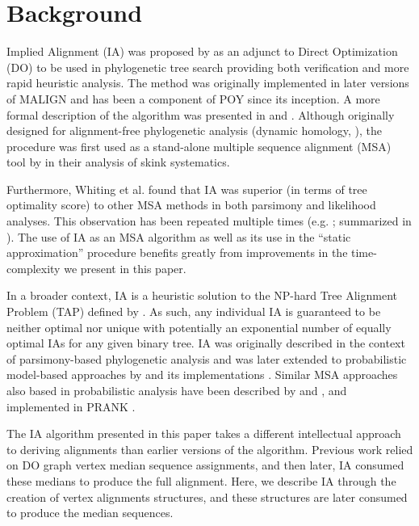 \documentclass{bmcart}
\begin{document}
\section*{Background}

Implied Alignment (IA) was proposed by \cite{Wheeler2003} as an adjunct to Direct Optimization (DO) \citep{Wheeler1996,VaronandWheeler2012} to be used in phylogenetic tree search providing both verification and more rapid heuristic analysis.
The method was originally implemented in later versions of MALIGN \citep{Wheeler1991-1998} and has been a component of POY \citep{Wheeleretal2015, POY2, POY3, POY5, Wheeleretal2006} since its inception.
A more formal description of the algorithm was presented in \cite{Wheeleretal2006} and \cite{VaronandWheeler2012}.
Although originally designed for alignment-free phylogenetic analysis (dynamic homology, \citealp{Wheeler2001}), the procedure was first used as a stand-alone multiple sequence alignment (MSA) tool by \cite{WhitingAetal2006} in their analysis of skink systematics.

Furthermore, Whiting et al. found that IA was superior (in terms of tree optimality score) to other MSA methods in both parsimony and likelihood analyses.
This observation has been repeated multiple times (e.g. \citealp{LindgrenandDaly2007, Lehtonen2008, WheelerandGiribet2009, FordandWheeler2015}; summarized in \citealp{Wheeler2012}).
The use of IA as an MSA algorithm as well as its use in the ``static approximation'' procedure \citep{Wheeler2003b} benefits greatly from improvements in the time-complexity we present in this paper.

In a broader context, IA is a heuristic solution to the NP-hard Tree Alignment Problem (TAP) defined by \cite{sankoff1975}.
As such, any individual IA is guaranteed to be neither optimal nor unique with potentially an exponential number of equally optimal IAs for any given binary tree.
IA was originally described in the context of parsimony-based phylogenetic analysis and was later extended to probabilistic model-based approaches by \cite{Wheeler2006} and its implementations \citep{Varonetal2010,Wheeleretal2015}.
Similar MSA approaches also based in probabilistic analysis have been described by \cite{LoytynojaandGoldman2008} and \cite{Loytynojaetal2010}, and implemented in PRANK \citep{PRANK}.

The IA algorithm presented in this paper takes a different intellectual approach to deriving alignments than earlier versions of the algorithm.
Previous work relied on DO graph vertex median sequence assignments, and then later, IA consumed these medians to produce the full alignment.
Here, we describe IA through the creation of vertex alignments structures, and these structures are later consumed to produce the median sequences.
\end{document}
